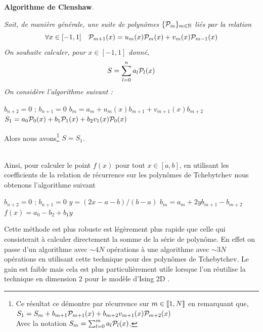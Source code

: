 \documentclass[10pt]{article}
\begin{document}
\begin{multicols}{2}
\noindent
\textbf{Algorithme de Clenshaw}. {\itshape
Soit, de manière générale, une suite de polynômes $\{\mathcal{P}_m\}_{m \in \mathbb{N}}$ liés par la relation
\begin{equation}
  \forall x \in [-1, 1] \quad \mathcal{P}_{m+1}(x) = u_m(x)\mathcal{P}_m(x) + v_m(x)\mathcal{P}_{m-1}(x)
\end{equation}
On souhaite calculer, pour $x \in [-1, 1]$ donné, 
\begin{equation}
  S = \sum_{l=0}^{n} a_l \mathcal{P}_l(x)
\end{equation}
On considère l'algorithme suivant :
\vspace*{-11pt}
\begin{algorithm}[H]
  \begin{algorithmic}[1]
    \STATE $b_{n+2} = 0$ ; $b_{n+1} = 0$
    \STATE $b_m = a_m + u_m(x)b_{m+1} + v_{m+1}(x)b_{m+2}$
    \ENDFOR
    \STATE $S_1 = a_0\mathcal{P}_0(x) + b_1\mathcal{P}_1(x) + b_2v_1(x)\mathcal{P}_0(x)$
  \end{algorithmic}
\end{algorithm}
\vspace*{-11pt}
\noindent
Alors nous avons\footnote{Ce résultat ce démontre par récurrence sur $m \in  \llbracket 1,N \rrbracket $ en remarquant que,
$S_1 = S_m +  b_{m+1}\mathcal{P}_{m+1}(x) + b_{m+2}v_{m+1}(x)\mathcal{P}_{m+2}(x)$\\
Avec la notation $S_m = \sum_{l=0}^{m} a_l \mathcal{P}_l(x)$.} $S = S_1$. 
} \\

Ainsi, pour calculer le point $f(x)$ pour tout $x \in [a,b]$, en utilisant les coefficients de la relation de récurrence sur les polynômes de Tchebytchev  nous obtenons l'algorithme suivant 

\begin{algorithm}[H]
  \begin{algorithmic}[1]
    \STATE $b_{n+2} = 0$ ; $b_{n+1} = 0$
    \STATE $y = (2x-a-b)/(b-a)$
    \STATE $b_m = a_m + 2yb_{m+1} - b_{m+2}$
    \ENDFOR
    \STATE $f(x) = a_0 - b_2 + b_1y$
  \end{algorithmic}
\end{algorithm}

Cette méthode \cite{clenshaw1955note} est plus robuste est légèrement plus rapide que celle qui consisterait à calculer directement la somme de la série de polynôme. En effet on passe d'un algorithme avec $\sim 4N$ opérations à une algorithme avec $\sim 3N$ opérations en utilisant cette technique pour des polynômes de Tchebytchev. Le gain est faible mais cela est plus particulièrement utile lorsque l'on réutilise la technique en dimension 2 pour le modèle d'Ising 2D .




\end{multicols}
\end{document}
